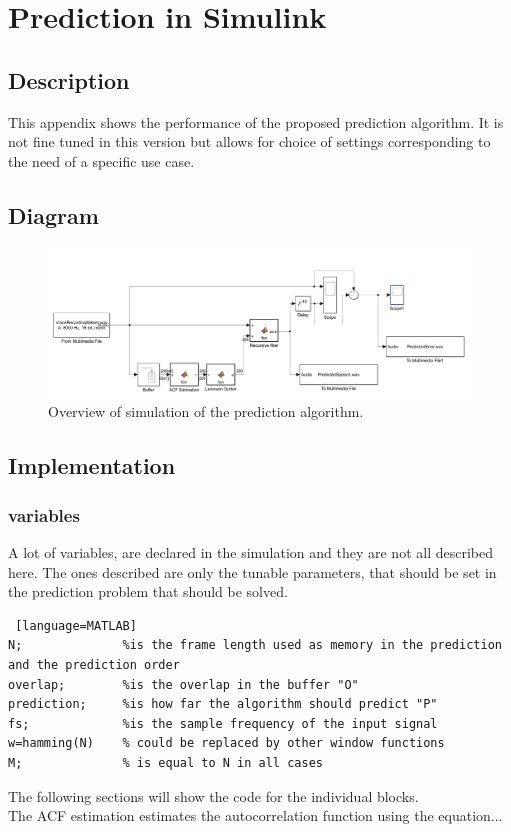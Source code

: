 
\section{Prediction in Simulink} \label{sec:predicSimulink}


\subsection{Description}
This appendix shows the performance of the proposed prediction algorithm. It is not fine tuned in this version but allows for choice of settings corresponding to the need of a specific use case.  


\subsection{Diagram}
\begin{figure} [h]
	\centering
	\includegraphics[width=\textwidth]{../Journal/Code/SimulinkPrediction}
	\caption{Overview of simulation of the prediction algorithm.}
	\label{Fig:PredictionSimulink}
\end{figure}


\subsection{Implementation}

\subsubsection{variables}
A lot of variables, are declared in the simulation and they are not all described here. The ones described are only the tunable parameters, that should be set in the prediction problem that should be solved. 
\begin{lstlisting} [language=MATLAB]
N; 				%is the frame length used as memory in the prediction and the prediction order
overlap;		%is the overlap in the buffer "O"
prediction; 	%is how far the algorithm should predict "P"
fs; 			%is the sample frequency of the input signal 
w=hamming(N)	% could be replaced by other window functions
M;				% is equal to N in all cases
\end{lstlisting}
The following sections will show the code for the individual blocks. \\
The ACF estimation estimates the autocorrelation function using the equation...
